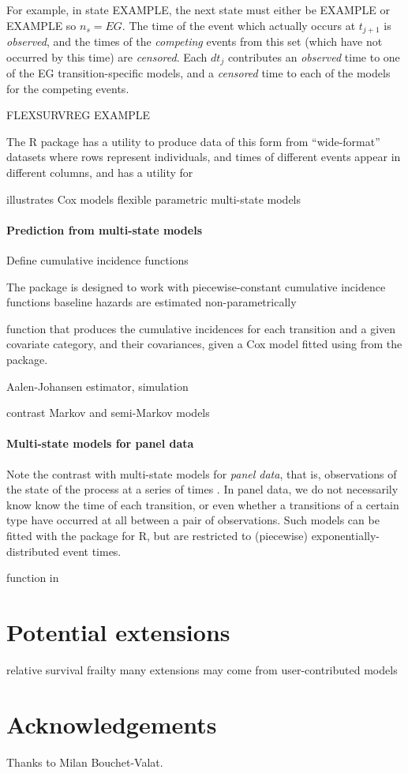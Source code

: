 \documentclass[nojss,nofooter]{jss}
\begin{document}
For example, in state EXAMPLE, the next state must either be EXAMPLE
or EXAMPLE so $n_s=EG$.  The time of the event which actually occurs
at $t_{j+1}$ is \emph{observed}, and the times of the \emph{competing}
events from this set (which have not occurred by this time) are
\emph{censored}.  Each $dt_{j}$ contributes an \emph{observed} time to
one of the EG transition-specific models, and a \emph{censored} time
to each of the models for the competing events.

FLEXSURVREG EXAMPLE

The  R package \citep{mstate:cmpb,mstate:jss} has a
utility  to produce data of this form from
``wide-format'' datasets where rows represent individuals, and times
of different events appear in different columns, and  has
a utility  for 

illustrates Cox models
flexible parametric multi-state models 

\paragraph{Prediction from multi-state models}

Define cumulative incidence functions

The  package is designed to work with 
piecewise-constant cumulative incidence functions
baseline hazards are estimated non-parametrically 
\citep{mstate:cmpb,mstate:jss} 

function  that produces the cumulative incidences for each transition and a given covariate category, and their covariances, given a Cox model fitted using  from the  package. 

Aalen-Johansen estimator,  simulation

contrast Markov and semi-Markov models

\paragraph{Multi-state models for panel data}

Note the contrast with multi-state models for \emph{panel data}, that is,
observations of the state of the process at a series of times
\citep{kalbfleisch:lawless}.  In panel data, we do not necessarily
know know the time of each transition, or even whether a transitions
of a certain type have occurred at all between a pair of observations.
Such models can be fitted with the  package for R, but are
restricted to (piecewise) exponentially-distributed event times.



 function in  


\section{Potential extensions}

relative survival
frailty 
many extensions may come from user-contributed models


\appendix
\section{Acknowledgements}
Thanks to Milan Bouchet-Valat.


\end{document}
